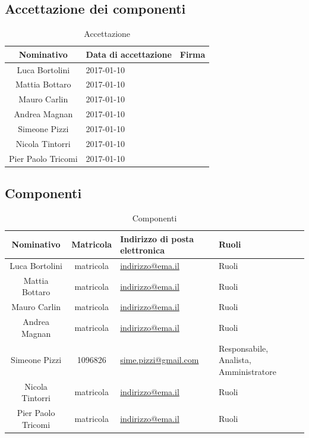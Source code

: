 \documentclass[a4paper,titlepage]{article}
\begin{document}
\subsection{Accettazione dei componenti}
\begin{table}[htbp]
	\begin{center}
		\setlength{\extrarowheight}{\jot}
		\begin{tabular}{|c|p{3.5cm}|p{6cm}|}
			\hline
			\textbf{Nominativo} & \textbf{Data di accettazione} & \textbf{Firma} \\[1ex]
			\hline
			Luca Bortolini	&	2017-01-10	& \\[1ex]
			\hline
			Mattia Bottaro		&	2017-01-10	& \\[1ex]
			\hline
			Mauro Carlin	&	2017-01-10	& \\[1ex]
			\hline
			Andrea Magnan	&	2017-01-10	& \\[1ex]
			\hline
			Simeone Pizzi	&	2017-01-10	& \\[1ex]
			\hline
			Nicola Tintorri	&	2017-01-10	& \\[1ex]
			\hline
			Pier Paolo Tricomi	&	2017-01-10	& \\[1ex]
			\hline
		\end{tabular}
	\end{center}
	\caption{Accettazione}
\end{table}

\subsection{Componenti}
\begin{table}[H]
	\begin{center}
		\setlength{\extrarowheight}{\jot}
		\begin{tabular}{|c|c|p{5cm}|p{4.3cm}|}
			\hline
			\textbf{Nominativo} & \textbf{Matricola} & \raggedright \textbf{Indirizzo di posta elettronica} & \textbf{Ruoli} \\[1ex]
			\hline
	 		Luca Bortolini	& matricola	& \href{mailto:indirizzo@ema.il}{indirizzo@ema.il} 	& Ruoli \\[1ex]
			\hline
			Mattia Bottaro	& matricola	& \href{mailto:indirizzo@ema.il}{indirizzo@ema.il} 	& Ruoli \\[1ex]
			\hline
			Mauro Carlin	& matricola	& \href{mailto:indirizzo@ema.il}{indirizzo@ema.il} 	& Ruoli	\\[1ex]
			\hline
			Andrea Magnan & matricola	& \href{mailto:indirizzo@ema.il}{indirizzo@ema.il} 	& Ruoli	\\[1ex]
			\hline
			Simeone Pizzi & 1096826	& \href{mailto:sime.pizzi@gmail.com}{sime.pizzi@gmail.com} 	& Responsabile, Analista, Amministratore 	\\[1ex]
			\hline
			Nicola Tintorri	& matricola	& \href{mailto:indirizzo@ema.il}{indirizzo@ema.il} 	& Ruoli 	\\[1ex]
			\hline
			Pier Paolo Tricomi	& matricola	& \href{mailto:indirizzo@ema.il}{indirizzo@ema.il} 	& Ruoli \\[1ex]
			\hline	
		\end{tabular}
	\end{center}
	\caption{Componenti}
\end{table}
\end{document}

